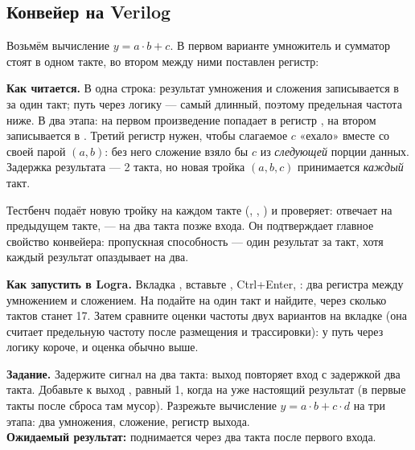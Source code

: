 \subsection{Конвейер на Verilog}
\label{sec:sync-pipe-v}

Возьмём вычисление $y=a\cdot b+c$. В первом варианте умножитель и сумматор
стоят в одном такте, во втором между ними поставлен регистр:



\textbf{Как читается.} В  одна строка: результат умножения и
сложения записывается в  за один такт; путь через логику --- самый
длинный, поэтому предельная частота ниже. В  два этапа: на первом
произведение попадает в регистр , на втором 
записывается в . Третий регистр  нужен, чтобы слагаемое $c$
«ехало» вместе со своей парой $(a,b)$: без него сложение взяло бы $c$ из
\emph{следующей} порции данных. Задержка результата --- 2 такта, но новая
тройка $(a,b,c)$ принимается \emph{каждый} такт.

Тестбенч  подаёт новую тройку на каждом такте
(, , ) и проверяет: 
отвечает на предыдущем такте,  --- на два такта позже входа. Он
подтверждает главное свойство конвейера: пропускная способность --- один
результат за такт, хотя каждый результат опаздывает на два.

\textbf{Как запустить в Logra.} Вкладка , вставьте ,
Ctrl+Enter, : два регистра между умножением и сложением. На
 подайте  на один такт и найдите,
через сколько тактов  станет 17. Затем сравните оценки частоты двух
вариантов на вкладке  (она считает предельную частоту после
размещения и трассировки): у  путь через логику короче, и оценка
обычно выше.

\begin{diybox}
\textbf{Задание.}  Задержите сигнал на два такта: выход
повторяет вход с задержкой два такта.  Добавьте к 
выход , равный 1, когда на  уже настоящий результат (в
первые такты после сброса там мусор).  Разрежьте вычисление
$y=a\cdot b+c\cdot d$ на три этапа: два умножения, сложение, регистр
выхода.\\
\textbf{Ожидаемый результат:}  поднимается через два такта после
первого входа.
\end{diybox}


